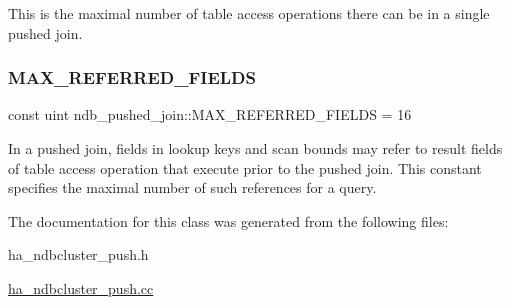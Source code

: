This is the maximal number of table access operations there can be in a single pushed join. \mbox{\label{classndb__pushed__join_a5045579b5ff3551499b1c23350136079}} 
\subsubsection{\texorpdfstring{M\+A\+X\+\_\+\+R\+E\+F\+E\+R\+R\+E\+D\+\_\+\+F\+I\+E\+L\+DS}{MAX\_REFERRED\_FIELDS}}
{\footnotesize\ttfamily const uint ndb\+\_\+pushed\+\_\+join\+::\+M\+A\+X\+\_\+\+R\+E\+F\+E\+R\+R\+E\+D\+\_\+\+F\+I\+E\+L\+DS = 16\hspace{0.3cm}{\ttfamily [static]}}

In a pushed join, fields in lookup keys and scan bounds may refer to result fields of table access operation that execute prior to the pushed join. This constant specifies the maximal number of such references for a query. 

The documentation for this class was generated from the following files\+:\begin{DoxyCompactItemize}
\item 
ha\+\_\+ndbcluster\+\_\+push.\+h\item 
\mbox{\hyperlink{ha__ndbcluster__push_8cc}{ha\+\_\+ndbcluster\+\_\+push.\+cc}}\end{DoxyCompactItemize}
